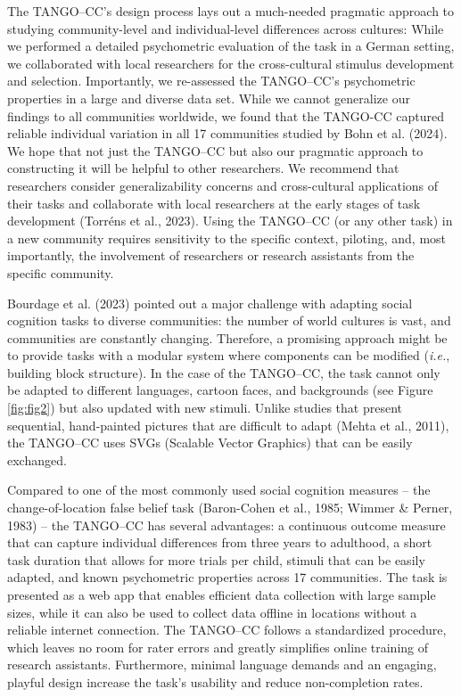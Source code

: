 \documentclass[
  man,floatsintext]{apa7}
\begin{document}
The TANGO--CC's design process lays out a much-needed pragmatic approach to studying community-level and individual-level differences across cultures:
While we performed a detailed psychometric evaluation of the task in a German setting, we collaborated with local researchers for the cross-cultural stimulus development and selection.
Importantly, we re-assessed the TANGO--CC's psychometric properties in a large and diverse data set.
While we cannot generalize our findings to all communities worldwide, we found that the TANGO-CC captured reliable individual variation in all 17 communities studied by Bohn et al. (2024).
We hope that not just the TANGO--CC but also our pragmatic approach to constructing it will be helpful to other researchers.
We recommend that researchers consider generalizability concerns and cross-cultural applications of their tasks and collaborate with local researchers at the early stages of task development (Torréns et al., 2023).
Using the TANGO--CC (or any other task) in a new community requires sensitivity to the specific context, piloting, and, most importantly, the involvement of researchers or research assistants from the specific community.

Bourdage et al. (2023) pointed out a major challenge with adapting social cognition tasks to diverse communities: the number of world cultures is vast, and communities are constantly changing.
Therefore, a promising approach might be to provide tasks with a modular system where components can be modified (\emph{i.e.}, building block structure).
In the case of the TANGO--CC, the task cannot only be adapted to different languages, cartoon faces, and backgrounds (see Figure \ref{fig:fig2}) but also updated with new stimuli.
Unlike studies that present sequential, hand-painted pictures that are difficult to adapt (Mehta et al., 2011), the TANGO--CC uses SVGs (Scalable Vector Graphics) that can be easily exchanged.

Compared to one of the most commonly used social cognition measures -- the change-of-location false belief task (Baron-Cohen et al., 1985; Wimmer \& Perner, 1983) -- the TANGO--CC has several advantages: a continuous outcome measure that can capture individual differences from three years to adulthood, a short task duration that allows for more trials per child, stimuli that can be easily adapted, and known psychometric properties across 17 communities.
The task is presented as a web app that enables efficient data collection with large sample sizes, while it can also be used to collect data offline in locations without a reliable internet connection.
The TANGO--CC follows a standardized procedure, which leaves no room for rater errors and greatly simplifies online training of research assistants.
Furthermore, minimal language demands and an engaging, playful design increase the task's usability and reduce non-completion rates.
\end{document}
